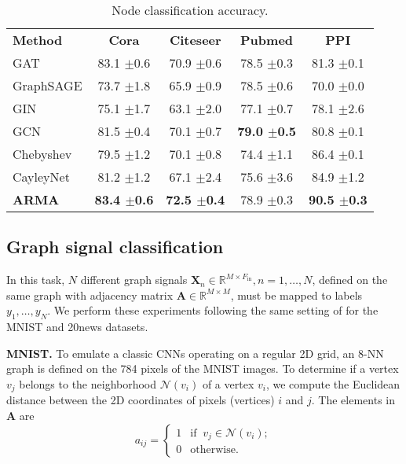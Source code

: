 \documentclass{article}
\def\A{{\mathbf A}}
\begin{document}
\begin{table}
\caption{Node classification accuracy.}
\setlength\tabcolsep{.6em} \small
\centering
\bgroup
\def\arraystretch{1.0} \begin{tabular}{lcccc}
\cmidrule[1.5pt]{1-5}
\textbf{Method} & \textbf{Cora} & \textbf{Citeseer} & \textbf{Pubmed} & \textbf{PPI} \\
\cmidrule[.5pt]{1-5}
GAT                     & 83.1 {\tiny$\pm$0.6} & 70.9 {\tiny$\pm$0.6} & 78.5 {\tiny$\pm$0.3} & 81.3 {\tiny$\pm$0.1} \\ GraphSAGE               & 73.7 {\tiny$\pm$1.8} & 65.9 {\tiny$\pm$0.9} & 78.5 {\tiny$\pm$0.6} & 70.0 {\tiny$\pm$0.0} \\ GIN                     & 75.1 {\tiny$\pm$1.7} & 63.1 {\tiny$\pm$2.0} & 77.1 {\tiny$\pm$0.7} & 78.1 {\tiny$\pm$2.6} \\ \cmidrule[.5pt]{1-5}
GCN                     & 81.5 {\tiny$\pm$0.4} & 70.1 {\tiny$\pm$0.7} & \textbf{79.0 {\tiny$\pm$0.5}} & 80.8 {\tiny$\pm$0.1} \\ Chebyshev               & 79.5 {\tiny$\pm$1.2} & 70.1 {\tiny$\pm$0.8} & 74.4 {\tiny$\pm$1.1} & 86.4 {\tiny$\pm$0.1} \\ CayleyNet               & 81.2 {\tiny$\pm$1.2} & 67.1 {\tiny$\pm$2.4} & 75.6 {\tiny$\pm$3.6} & 84.9 {\tiny$\pm$1.2} \\ \textbf{ARMA}           & \textbf{83.4 {\tiny$\pm$0.6}} & \textbf{72.5 {\tiny$\pm$0.4}} & 78.9 {\tiny$\pm$0.3} & \textbf{90.5 {\tiny$\pm$0.3}} \\ \cmidrule[1.5pt]{1-5}
\end{tabular}
\label{tab:nodecl_res}
\egroup
\end{table}


\subsection{Graph signal classification}
In this task, $N$ different graph signals $\mathbf{X}_n \in \mathbb{R}^{M \times F_\text{in}}, n=1,\dots,N$, defined on the same graph with adjacency matrix $\mathbf{A} \in \mathbb{R}^{M \times M}$, must be mapped to labels $y_1, \dots, y_N$.
We perform these experiments following the same setting of \cite{defferrard2016convolutional} for the MNIST and 20news datasets.

\textbf{MNIST.} To emulate a classic CNNs operating on a regular 2D grid, an 8-NN graph is defined on the 784 pixels of the MNIST images. 
To determine if a vertex $v_j$ belongs to the neighborhood $\mathcal{N}(v_i)$ of a vertex $v_i$, we compute the Euclidean distance between the 2D coordinates of pixels (vertices) $i$ and $j$.
The elements in $\A$ are  
\begin{equation}
\label{eq:edges}
    a_{ij} = 
    \begin{cases}
    1 & \text{if} \;\; v_j \in \mathcal{N}(v_i); \\
    0 & \text{otherwise}.
    \end{cases}
\end{equation}
\end{document}
